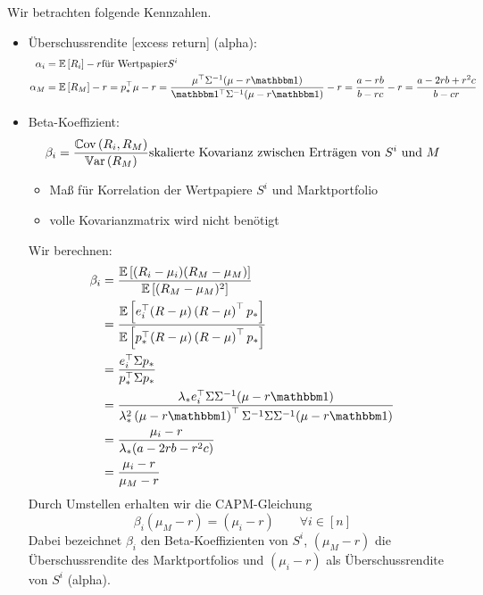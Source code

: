 Wir betrachten folgende Kennzahlen.
\begin{itemize}
	\item Überschussrendite [excess return] (alpha):
	\begin{equation*}
		\begin{aligned}
		\alpha_i &= \EW[R_i] - r \text{für Wertpapier} S^i \\
		\alpha_M 
		&= \EW[R_M] - r = \trans{p_\ast} \mu - r 
		= \frac{\trans{\mu} \Sigma^{-1} (\mu - r \one)}{\trans{\one} \Sigma^{-1} (\mu - r \one)} - r 
		= \frac{a - rb}{b - rc} - r 
		= \frac{a - 2rb + r^2 c}{b - cr}
		\end{aligned}
	\end{equation*}
	\item Beta-Koeffizient:
	\begin{equation*}
		\beta_i = \frac{\Cov{R_i}{R_M}}{\Var[R_M]} \text{skalierte Kovarianz zwischen Erträgen von } S^i \und M
	\end{equation*}
	\begin{itemize}[nolistsep]
		\item Maß für Korrelation der Wertpapiere $S^i$ und Marktportfolio
		\item volle Kovarianzmatrix wird nicht benötigt
	\end{itemize}
	Wir berechnen:
	\begin{equation*}
		\begin{aligned}
			\beta_i 
			&= \frac{\EW[(R_i - \mu_i)(R_M - \mu_M)]}{\EW[(R_M - \mu_M)^2]} \\
			&= \frac{\EW[\trans{e_i}(R-\mu)\transpose{R-\mu}p_\ast]}{\EW[\trans{p_\ast} (R-\mu) \transpose{R-\mu} p_\ast]} \\
			&= \frac{\trans{e_i} \Sigma p_\ast}{\trans{p_\ast}\Sigma p_\ast} \\
			&= \frac{\lambda_\ast \trans{e_i} \Sigma \Sigma^{-1} (\mu - r \one)}{\lambda_\ast^2 \transpose{\mu - r\one} \Sigma^{-1} \Sigma \Sigma^{-1} (\mu - r\one)} \\
			&= \frac{\mu_i - r}{\lambda_\ast (a-2rb - r^2 c)} \\
			&= \frac{\mu_i - r}{\mu_M - r}
		\end{aligned}
	\end{equation*}
	Durch Umstellen erhalten wir die CAPM-Gleichung
	\begin{equation*}
		\beta_i (\mu_M - r) = (\mu_i - r) \qquad \forall i \in [n]
	\end{equation*}
	Dabei bezeichnet $\beta_i$ den Beta-Koeffizienten von $S^i$, $(\mu_M - r)$ die Überschussrendite des Marktportfolios und $(\mu_i - r)$ als Überschussrendite von $S^i$ (alpha). 

\end{itemize}
